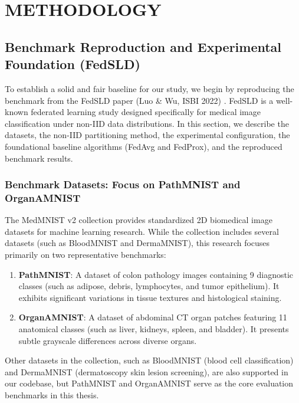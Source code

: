 \chapter{METHODOLOGY}
\label{ch:methodology}

\graphicspath{{Chapter3/Figs/Raster/}{Chapter3/Figs/PDF/}{Chapter3/Figs/Vector/}{Chapter3/Figs/}}

\section{Benchmark Reproduction and Experimental Foundation (FedSLD)}
\label{sec:fedsld_reproduction}

To establish a solid and fair baseline for our study, we begin by reproducing the benchmark from the FedSLD paper (Luo \& Wu, ISBI 2022) \cite{luo2022fedsld}. FedSLD is a well-known federated learning study designed specifically for medical image classification under non-IID data distributions. In this section, we describe the datasets, the non-IID partitioning method, the experimental configuration, the foundational baseline algorithms (FedAvg and FedProx), and the reproduced benchmark results.

\subsection{Benchmark Datasets: Focus on PathMNIST and OrganAMNIST}
The MedMNIST v2 collection \cite{yang2023medmnist} provides standardized 2D biomedical image datasets for machine learning research. While the collection includes several datasets (such as BloodMNIST and DermaMNIST), this research focuses primarily on two representative benchmarks:
\begin{enumerate}
    \item \textbf{PathMNIST}: A dataset of colon pathology images containing 9 diagnostic classes (such as adipose, debris, lymphocytes, and tumor epithelium). It exhibits significant variations in tissue textures and histological staining.
    \item \textbf{OrganAMNIST}: A dataset of abdominal CT organ patches featuring 11 anatomical classes (such as liver, kidneys, spleen, and bladder). It presents subtle grayscale differences across diverse organs.
\end{enumerate}
Other datasets in the collection, such as BloodMNIST (blood cell classification) and DermaMNIST (dermatoscopy skin lesion screening), are also supported in our codebase, but PathMNIST and OrganAMNIST serve as the core evaluation benchmarks in this thesis.

